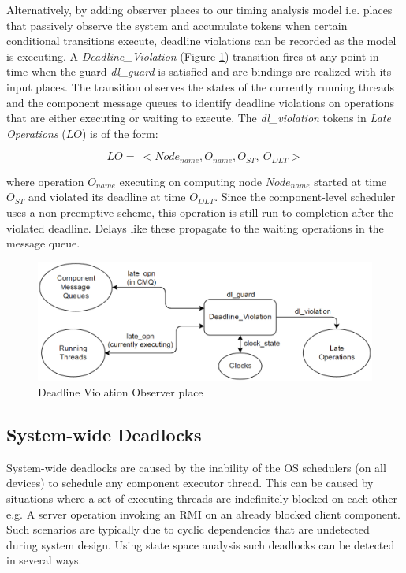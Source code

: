 Alternatively, by adding observer places to our timing analysis model i.e. places that passively observe the system and accumulate tokens when certain conditional transitions execute, deadline violations can be recorded as the model is executing. A \emph{Deadline\_Violation} (Figure \ref{fig:DL}) transition fires at any point in time when the guard \emph{dl\_guard} is satisfied and arc bindings are realized with its input places. The transition observes the states of the currently running threads and the component message queues to identify deadline violations on operations that are either executing or waiting to execute. The \emph{dl\_violation} tokens in \emph{Late Operations} ($LO$) is of the form:

\begin{equation}
\label{eq:DLV}
LO = \ <Node_{name}, O_{name}, O_{ST}, \ O_{DLT}>
\end{equation}

where operation $O_{name}$ executing on computing node $Node_{name}$ started at time $O_{ST}$ and violated its deadline at time $O_{DLT}$. Since the component-level scheduler uses a non-preemptive scheme, this operation is still run to completion after the violated deadline. Delays like these propagate to the waiting operations in the message queue.

\begin{figure}[htb]
	\centering
	\includegraphics[width=\textwidth]{./img/Deadline_Violations.png}
	\caption{Deadline Violation Observer place}
	\label{fig:DL}
\end{figure}
\FloatBarrier

\subsection{System-wide Deadlocks}

System-wide deadlocks are caused by the inability of the OS schedulers (on all devices) to schedule any component executor thread. This can be caused by situations where a set of executing threads are indefinitely blocked on each other e.g. A server operation invoking an RMI on an already blocked client component. Such scenarios are typically due to cyclic dependencies that are undetected during system design. Using state space analysis such deadlocks can be detected in several ways.

